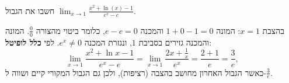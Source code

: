 
\begin{question}
חשבו את הגבול $\displaystyle\lim_{x\to 1}\frac{x^2+\ln(x)-1}{e^x-e}$.
\end{question}

\begin{solution}
בהצבת $x=1$: המונה $1+0-1=0$ והמכנה $e-e=0$, כלומר ביטוי מהצורה $\frac00$. המונה והמכנה גזירים בסביבת $1$, ונגזרת המכנה $e^x\neq 0$. לפי \textbf{כלל לופיטל}:
\[ \lim_{x\to1}\frac{x^2+\ln x-1}{e^x-e}=\lim_{x\to1}\frac{2x+\frac1x}{e^x}=\frac{2+1}{e}=\frac{3}{e}, \]
כאשר הגבול האחרון מחושב בהצבה (רציפות), ולכן גם הגבול המקורי קיים ושווה ל-$\frac{3}{e}$.
\end{solution}
